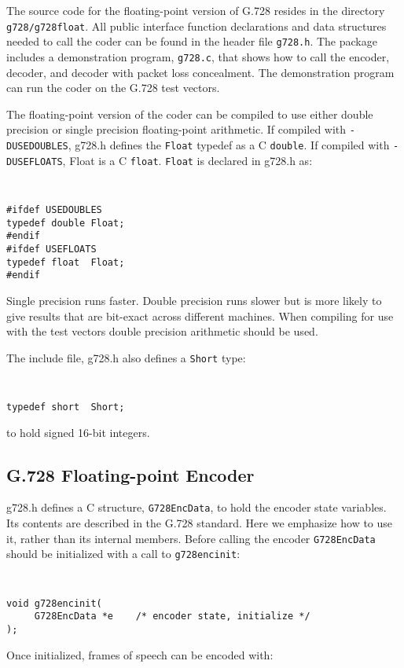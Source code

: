 The source code for the floating-point version of G.728 resides in the
directory {\tt g728/g728float}. All public interface function
declarations and data structures needed to call the coder
can be found in the header file {\tt g728.h}. The package includes a demonstration program, {\tt g728.c},
that shows how to call the encoder, decoder, and decoder with
packet loss concealment. The demonstration program can
run the coder on the G.728 test vectors.

The floating-point version of the coder can be compiled to use either
double precision or single precision floating-point arithmetic. If
compiled with {\tt -DUSEDOUBLES}, g728.h defines the {\tt Float}
typedef as a C {\tt double}. If compiled with {\tt -DUSEFLOATS}, Float
is a C {\tt float}. {\tt Float} is declared in g728.h as: {\tt\small
\begin{verbatim}
#ifdef USEDOUBLES
typedef double Float;
#endif
#ifdef USEFLOATS
typedef float  Float;
#endif
\end{verbatim}
}
Single precision runs faster. Double precision runs slower
but is more likely to give results that are bit-exact across
different machines. When compiling for use with the test vectors
double precision arithmetic should be used.

The include file, g728.h also defines a {\tt Short} type:

{\tt\small
\begin{verbatim}
typedef short  Short;
\end{verbatim}
}

to hold signed 16-bit integers.

\subsection {G.728 Floating-point Encoder}

g728.h defines a C structure, {\tt G728EncData}, to hold the encoder
state variables. Its contents are described in the G.728 standard.
Here we emphasize how to use it, rather than
its internal members. Before calling the encoder
{\tt G728EncData} should be initialized with a call to {\tt g728encinit}:

{\tt\small
\begin{verbatim}
void g728encinit(
     G728EncData *e    /* encoder state, initialize */
);
\end{verbatim}
}

Once initialized, frames of speech can be encoded with:

